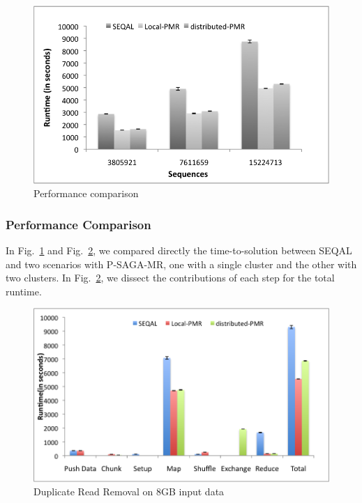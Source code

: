 \documentclass{sig-alternate}
\begin{document}
\begin{figure}
 \centering
\includegraphics[scale=0.55]{figures/seqalvslocalpmr.png}

\caption{\small Performance comparison}
  \label{fig:comp_with_seqal_1} 
\end{figure}

\subsubsection{Performance Comparison}
In Fig.~\ref{fig:comp_with_seqal_1} and Fig.~\ref{fig:comp_with_seqal_2}, we compared directly the time-to-solution between SEQAL and two scenarios with P-SAGA-MR, one with a single cluster and the other with two clusters.  In Fig.~\ref{fig:comp_with_seqal_2}, we dissect the contributions of each step for the total runtime.




\begin{figure}
 \centering
\includegraphics[scale=0.55]{figures/8GB_phasewisetimes.png}

\caption{\small  Duplicate Read Removal on 8GB input data}
  \label{fig:comp_with_seqal_2} 
\end{figure}
\end{document}
